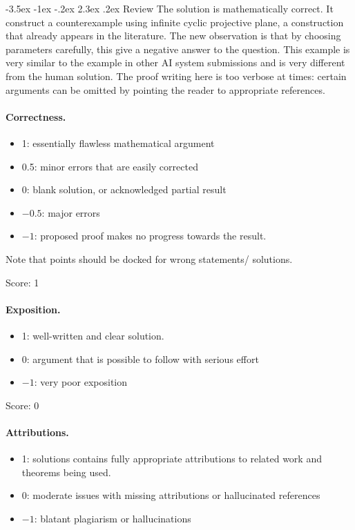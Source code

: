 \documentclass[11pt]{article}
\makeatletter
\renewcommand\section{\@startsection{section}{1}{\z@}
  {-3.5ex \@plus -1ex \@minus -.2ex}
  {2.3ex \@plus.2ex}
  {\normalfont\bfseries}}
\theoremstyle{plain}
\theoremstyle{definition}
\makeatother
\begin{document}
\maketitle

\section{Review}
{The solution is mathematically correct. It construct a counterexample using  infinite cyclic projective plane, a construction that already appears in the literature. The new observation is that by choosing parameters carefully, this give a negative answer to the question. This example is very similar to the example in other AI system submissions and is very different from the human solution. The proof writing here is too verbose at times: certain arguments can be omitted by pointing the reader to appropriate references.}

\paragraph{Correctness.}
\begin{itemize}
	\item  1: essentially flawless mathematical argument
	\item  0.5: minor errors that are easily corrected
	\item  0: blank solution, or acknowledged partial result
	\item  $-0.5$: major errors
	\item  $-1$: proposed proof makes no progress towards the result.
\end{itemize}
Note that points should be docked for wrong statements/ solutions.

\noindent Score: 1

\paragraph{Exposition.}
\begin{itemize}
	\item  1: well-written and clear solution.
	\item  0: argument that is possible to follow with serious effort
	\item  $-1$: very poor exposition
\end{itemize}

\noindent Score: 0

\paragraph{Attributions.}
\begin{itemize}
	\item  1: solutions contains fully appropriate attributions
		to related work and theorems being used.
	\item  0: moderate issues with missing attributions or hallucinated references
	\item  $-1$: blatant plagiarism or hallucinations
\end{itemize}
\end{document}
